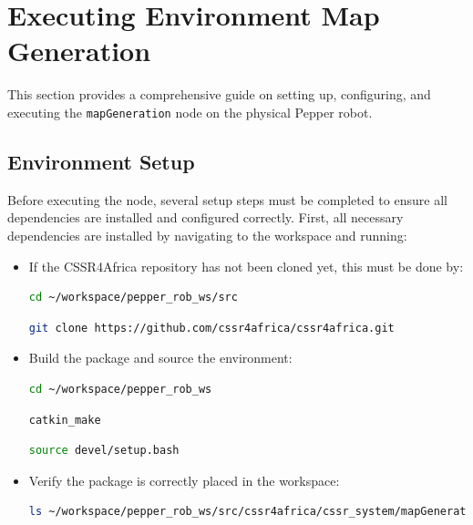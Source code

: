 \documentclass{CSSRforAfrica}
\begin{document}
\newpage
\section{Executing Environment Map Generation}
This section provides a comprehensive guide on setting up, configuring, and executing the \texttt{mapGeneration} node on the physical Pepper robot.

\subsection{Environment Setup}

Before executing the node, several setup steps must be completed to ensure all dependencies are installed and configured correctly. First, all necessary dependencies are installed by navigating to the workspace and running:

\begin{itemize}
\begin{lstlisting}[style=withoutNumbering, language=bash]
cd ~/workspace/pepper_rob_ws
\end{lstlisting}

\begin{lstlisting}[style=withoutNumbering, language=bash]
rosdep install --from-paths src --ignore-src -r -y
\end{lstlisting}

\item If the CSSR4Africa repository has not been cloned yet, this must be done by:
\begin{lstlisting}[style=withoutNumbering, language=bash]
cd ~/workspace/pepper_rob_ws/src
\end{lstlisting}

\begin{lstlisting}[style=withoutNumbering, language=bash]
git clone https://github.com/cssr4africa/cssr4africa.git
\end{lstlisting}

\item Build the package and source the environment:
\begin{lstlisting}[style=withoutNumbering, language=bash]
cd ~/workspace/pepper_rob_ws
\end{lstlisting}
\begin{lstlisting}[style=withoutNumbering, language=bash]
catkin_make
\end{lstlisting}
\begin{lstlisting}[style=withoutNumbering, language=bash]
source devel/setup.bash
\end{lstlisting}

\item Verify the package is correctly placed in the workspace:
\begin{lstlisting}[style=withoutNumbering, language=bash]
ls ~/workspace/pepper_rob_ws/src/cssr4africa/cssr_system/mapGeneration
\end{lstlisting}
\end{itemize}
\end{document}
